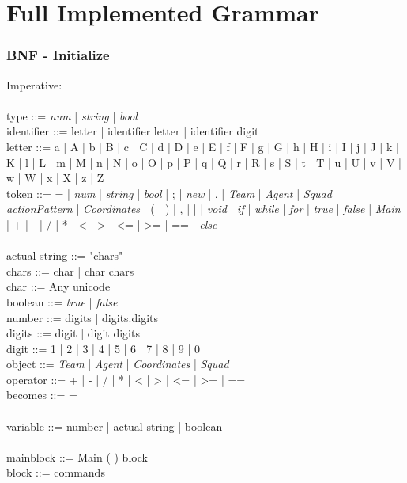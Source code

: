 \chapter{Full Implemented Grammar}
\label{ap:fullgrammar}

\subsection{BNF - Initialize}

Imperative:\\
\\
type ::= \textit{num} | \textit{string} | \textit{bool}\\
identifier ::= letter | identifier letter | identifier digit\\
letter ::= a | A | b | B | c | C | d | D | e | E | f | F | g | G | h | H | i | I | j | J | k | K | l | L | m | M | n | N | o | O | p | P | q | Q | r | R | s | S | t | T | u | U | v | V | w | W | x | X | z | Z\\
token ::= = | \textit{num} | \textit{string} | \textit{bool} | ; | \textit{new} | . | \textit{Team} | \textit{Agent} | \textit{Squad} | \textit{actionPattern} | \textit{Coordinates}  | ( | ) | , | { | } | \textit{void} | \textit{if} | \textit{while} | \textit{for} | \textit{true} | \textit{false} | \textit{Main} | + | - | / | * | < | > | <= | >= | == | \textit{else}\\
\\
actual-string ::= "chars"\\
chars ::= char | char chars\\
char ::= Any unicode\\
boolean ::= \textit{true} | \textit{false}\\
number ::= digits | digits.digits\\
digits ::= digit | digit digits\\
digit ::= 1 | 2 | 3 | 4 | 5 | 6 | 7 | 8 | 9 | 0\\
object ::= \textit{Team} | \textit{Agent} | \textit{Coordinates} | \textit{Squad}\\
operator ::= + | - | / | * | < | > | <= | >= | ==\\
becomes ::= =\\
\\
variable ::= number | actual-string | boolean\\
\\
mainblock ::= Main ( ) block\\
block ::= { commands }\\

